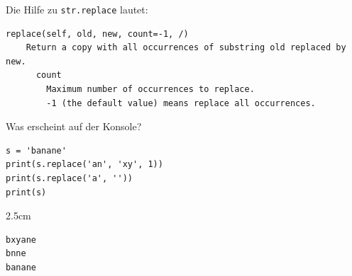 \question[3]
Die Hilfe zu \texttt{str.replace} lautet:
\begin{lstlisting}[language={}]
replace(self, old, new, count=-1, /)
    Return a copy with all occurrences of substring old replaced by new.
      count
        Maximum number of occurrences to replace.
        -1 (the default value) means replace all occurrences.
\end{lstlisting}
Was erscheint auf der Konsole?
\begin{lstlisting}
s = 'banane'
print(s.replace('an', 'xy', 1))
print(s.replace('a', ''))
print(s)
\end{lstlisting}
\begin{solutionbox}{2.5cm}
\begin{lstlisting}[language={}]
bxyane
bnne
banane
\end{lstlisting}
\end{solutionbox}
